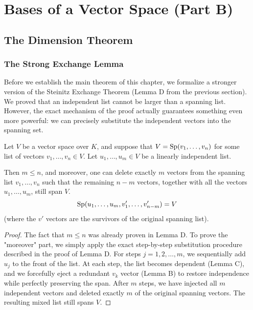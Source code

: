 \chapter{Bases of a Vector Space (Part B)}
\section{The Dimension Theorem}

\subsection{The Strong Exchange Lemma}

Before we establish the main theorem of this chapter, we formalize a stronger version of the Steinitz Exchange Theorem (Lemma D from the previous section). We proved that an independent list cannot be larger than a spanning list. However, the exact mechanism of the proof actually guarantees something even more powerful: we can precisely substitute the independent vectors into the spanning set.

\begin{lemma}
Let $V$ be a vector space over $K$, and suppose that $V = \operatorname{Sp}(v_1, \dots, v_n)$ for some list of vectors $v_1, \dots, v_n \in V$. Let $u_1, \dots, u_m \in V$ be a linearly independent list. 

Then $m \le n$, and moreover, one can delete exactly $m$ vectors from the spanning list $v_1, \dots, v_n$ such that the remaining $n-m$ vectors, together with all the vectors $u_1, \dots, u_m$, still span $V$.
\[
\operatorname{Sp}(u_1, \dots, u_m, v'_1, \dots, v'_{n-m}) = V
\]
(where the $v'$ vectors are the survivors of the original spanning list).
\end{lemma}

\begin{proof}
The fact that $m \le n$ was already proven in Lemma D. To prove the "moreover" part, we simply apply the exact step-by-step substitution procedure described in the proof of Lemma D. 
For steps $j = 1, 2, \dots, m$, we sequentially add $u_j$ to the front of the list. At each step, the list becomes dependent (Lemma C), and we forcefully eject a redundant $v_k$ vector (Lemma B) to restore independence while perfectly preserving the span. After $m$ steps, we have injected all $m$ independent vectors and deleted exactly $m$ of the original spanning vectors. The resulting mixed list still spans $V$.
\end{proof}


